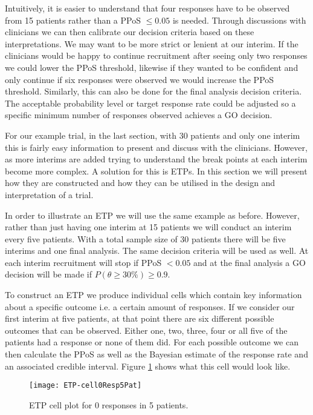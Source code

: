 Intuitively, it is easier to understand that four responses have to be observed from 15 patients rather than a PPoS $\leq 0.05$ is needed. Through discussions with clinicians we can then calibrate our decision criteria based on these interpretations. We may want to be more strict or lenient at our interim. If the clinicians would be happy to continue recruitment after seeing only two responses we could lower the PPoS threshold, likewise if they wanted to be confident and only continue if six responses were observed we would increase the PPoS threshold. Similarly, this can also be done for the final analysis decision criteria. The acceptable probability level or target response rate could be adjusted so a specific minimum number of responses observed achieves a GO decision.  

For our example trial, in the last section, with 30 patients and only one interim this is fairly easy information to present and discuss with the clinicians. However, as more interims are added trying to understand the break points at each interim become more complex. A solution for this is ETPs. In this section we will present how they are constructed and how they can be utilised in the design and interpretation of a trial. 

In order to illustrate an ETP we will use the same example as before. However, rather than just having one interim at 15 patients we will conduct an interim every five patients. With a total sample size of 30 patients there will be five interims and one final analysis. The same decision criteria will be used as well. At each interim recruitment will stop if PPoS $< 0.05$ and at the final analysis a GO decision will be made if $P(\theta  \geq 30\%) \geq 0.9$. 

To construct an ETP we produce individual cells which contain key information about a specific outcome i.e. a certain amount of responses. If we consider our first interim at five patients, at that point there are six different possible outcomes that can be observed. Either one, two, three, four or all five of the patients had a response or none of them did. For each possible outcome we can then calculate the PPoS as well as the Bayesian estimate of the response rate and an associated credible interval. Figure \ref{fig_etp:Cell0Resp5Pat} shows what this cell would look like. 

\begin{figure}[h!]
	\centering
	\caption{ETP cell plot for 0 responses in 5 patients.}
	\label{fig_etp:Cell0Resp5Pat}
	\texttt{[image: ETP-cell0Resp5Pat]}
\end{figure}

